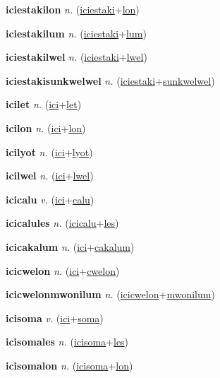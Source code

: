 \textbf{\hypertarget{iciestakilon}{iciestakilon}} \textit{n.} (\hyperlink{iciestaki}{iciestaki}+\allowbreak \hyperlink{lon}{lon})


\textbf{\hypertarget{iciestakilum}{iciestakilum}} \textit{n.} (\hyperlink{iciestaki}{iciestaki}+\allowbreak \hyperlink{lum}{lum})


\textbf{\hypertarget{iciestakilwel}{iciestakilwel}} \textit{n.} (\hyperlink{iciestaki}{iciestaki}+\allowbreak \hyperlink{lwel}{lwel})


\textbf{\hypertarget{iciestakisunkwelwel}{iciestakisunkwelwel}} \textit{n.} (\hyperlink{iciestaki}{iciestaki}+\allowbreak \hyperlink{sunkwelwel}{sunkwelwel})


\textbf{\hypertarget{icilet}{icilet}} \textit{n.} (\hyperlink{ici}{ici}+\allowbreak \hyperlink{let}{let})


\textbf{\hypertarget{icilon}{icilon}} \textit{n.} (\hyperlink{ici}{ici}+\allowbreak \hyperlink{lon}{lon})


\textbf{\hypertarget{icilyot}{icilyot}} \textit{n.} (\hyperlink{ici}{ici}+\allowbreak \hyperlink{lyot}{lyot})


\textbf{\hypertarget{icilwel}{icilwel}} \textit{n.} (\hyperlink{ici}{ici}+\allowbreak \hyperlink{lwel}{lwel})


\textbf{\hypertarget{icicalu}{icicalu}} \textit{v.} (\hyperlink{ici}{ici}+\allowbreak \hyperlink{calu}{calu})


\textbf{\hypertarget{icicalules}{icicalules}} \textit{n.} (\hyperlink{icicalu}{icicalu}+\allowbreak \hyperlink{les}{les})


\textbf{\hypertarget{icicakalum}{icicakalum}} \textit{n.} (\hyperlink{ici}{ici}+\allowbreak \hyperlink{cakalum}{cakalum})


\textbf{\hypertarget{icicwelon}{icicwelon}} \textit{n.} (\hyperlink{ici}{ici}+\allowbreak \hyperlink{cwelon}{cwelon})


\textbf{\hypertarget{icicwelonmwonilum}{icicwelonmwonilum}} \textit{n.} (\hyperlink{icicwelon}{icicwelon}+\allowbreak \hyperlink{mwonilum}{mwonilum})


\textbf{\hypertarget{icisoma}{icisoma}} \textit{v.} (\hyperlink{ici}{ici}+\allowbreak \hyperlink{soma}{soma})


\textbf{\hypertarget{icisomales}{icisomales}} \textit{n.} (\hyperlink{icisoma}{icisoma}+\allowbreak \hyperlink{les}{les})


\textbf{\hypertarget{icisomalon}{icisomalon}} \textit{n.} (\hyperlink{icisoma}{icisoma}+\allowbreak \hyperlink{lon}{lon})



